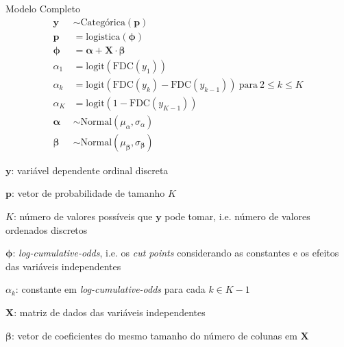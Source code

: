 \begin{frame}{Modelo Completo}
	\footnotesize
	$$
		\begin{aligned}
			\mathbf{y}          & \sim \text{Categórica}(\mathbf{p})                                                          \\
			\mathbf{p}          & = \mathrm{logistica}(\boldsymbol{\phi})                                                     \\
			\boldsymbol{\phi}   & = \boldsymbol{\alpha} + \mathbf{X} \cdot \boldsymbol{\beta}                                 \\
			\alpha_1            & = \mathrm{logit}(\mathrm{FDC}(y_1))                                                         \\
			\alpha_k            & = \mathrm{logit}(\mathrm{FDC}(y_k) - \mathrm{FDC}(y_{k-1})) \mathrm{~para~} 2 \leq k \leq K \\
			\alpha_{K}          & = \mathrm{logit}(1 - \mathrm{FDC}(y_{K-1}))                                                 \\
			\boldsymbol{\alpha} & \sim \text{Normal}(\mu_\alpha, \sigma_\alpha)                                               \\
			\boldsymbol{\beta}  & \sim \text{Normal}(\mu_{\boldsymbol{\beta}}, \sigma_{\boldsymbol{\beta}})
		\end{aligned}
	$$
	\begin{vfilleditems}
		\item \footnotesize  $\mathbf{y}$: variável dependente ordinal discreta
		\item \footnotesize  $\mathbf{p}$: vetor de probabilidade de tamanho $K$
		\item \footnotesize  $K$: número de valores possíveis que $\mathbf{y}$ pode tomar, i.e. número de valores ordenados discretos
		\item \footnotesize  $\boldsymbol{\phi}$: \textit{log-cumulative-odds}, i.e. os \textit{cut points} considerando as constantes e os efeitos das variáveis independentes
		\item \footnotesize  $\alpha_k$: constante em \textit{log-cumulative-odds} para cada $k \in K-1$
		\item \footnotesize  $\mathbf{X}$: matriz de dados das variáveis independentes
		\item \footnotesize  $\boldsymbol{\beta}$: vetor de coeficientes do mesmo tamanho do número de colunas em $\mathbf{X}$
	\end{vfilleditems}
\end{frame}

